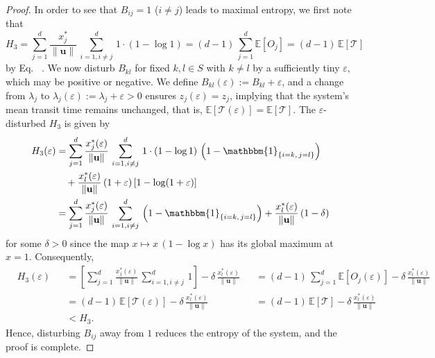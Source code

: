 \documentclass[smallextended]{svjour3}
\makeatletter
\renewcommand*{\eqref}[1]{%
  \hyperref[{#1}]{\textup{\tagform@{\ref*{#1}}}}%
}
\renewcommand{\vec}[1]{\mathbf{#1}}
\newcommand{\E}{\mathbb{E}}
\newcommand{\TT}{\mathcal{T}}
\newcommand{\suml}{\sum\limits}
\newcommand{\vnorms}[1]{\|#1\|}
\newcommand{\ie}{that is}
\makeatother
\begin{document}
\begin{proof}
		In order to see that $B_{ij}=1$ ($i\neq j$) leads to maximal entropy, we first note that 
		\begin{equation}
			H_3 = \suml_{j=1}^d \frac{x^\ast_j}{\vnorms{\vec{u}}}\,\suml_{i=1,i\neq j}^d \,1\cdot(1-\log 1) = (d-1)\,\suml_{j=1}^d \E\left[O_j\right] = (d-1)\,\E\left[\TT\right]
		\end{equation}
		by Eq.~\eqref{eqn:H_occupation_time}.
		We now disturb $B_{kl}$ for fixed $k,l\in S$ with $k\neq l$ by a sufficiently tiny $\varepsilon$, which may be positive or negative.
		We define $B_{kl}(\varepsilon):=B_{kl}+\varepsilon$, and a change from $\lambda_j$ to $\lambda_j(\varepsilon):=\lambda_j+\varepsilon>0$ ensures $z_j(\varepsilon) = z_j$, implying that the system's mean transit time remains unchanged, \ie, $\E\left[\TT(\varepsilon)\right] = \E\left[\TT\right]$.
		The $\varepsilon$-disturbed $H_3$ is given by
		\begin{equation}
      \begin{aligned}
        H_3(\varepsilon) &= \suml_{j=1}^d \frac{x^\ast_j(\varepsilon)}{\vnorms{\vec{u}}}\,\suml_{i=1,i\neq j}^d \,1\cdot(1-\log 1)\,\left(1-\mathbbm{1}_{\{i=k,\,j=l\}}\right)\\
        &\quad + \frac{x^\ast_l(\varepsilon)}{\vnorms{\vec{u}}}\,(1+\varepsilon)\,[1-\log(1+\varepsilon)]\\
        &= \suml_{j=1}^d \frac{x^\ast_j(\varepsilon)}{\vnorms{\vec{u}}}\,\suml_{i=1,i\neq j}^d \,\left(1-\mathbbm{1}_{\{i=k,\,j=l\}}\right) + \frac{x^\ast_l(\varepsilon)}{\vnorms{\vec{u}}}\,(1-\delta)\\
      \end{aligned}
    \end{equation}
		for some $\delta>0$ since the map $x\mapsto x\,(1-\log x)$ has its global maximum at $x=1$.
		Consequently,
		\begin{equation}
		\begin{aligned}
			&H_3(\varepsilon) &&= \left[\suml_{j=1}^d \frac{x^\ast_j(\varepsilon)}{\vnorms{\vec{u}}}\,\suml_{i=1,i\neq j}^d \,1\right] - \delta\,\frac{x^\ast_l(\varepsilon)}{\vnorms{\vec{u}}}
			&&= (d-1)\,\suml_{j=1}^d \E\left[O_j(\varepsilon)\right] - \delta\,\frac{x^\ast_l(\varepsilon)}{\vnorms{\vec{u}}}\\
			& &&= (d-1)\,\E\left[\TT(\varepsilon)\right] - \delta\,\frac{x^\ast_l(\varepsilon)}{\vnorms{\vec{u}}}
			&&= (d-1)\,\E\left[\TT\right] - \delta\,\frac{x^\ast_l(\varepsilon)}{\vnorms{\vec{u}}}\\
			& && < H_3.
		\end{aligned}
	\end{equation}
		Hence, disturbing $B_{ij}$ away from $1$ reduces the entropy of the system, and the proof is complete.
	\end{proof}
\end{document}
